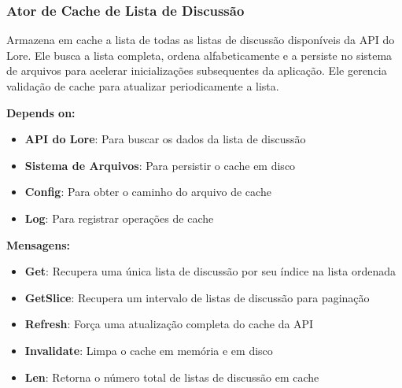 \subsubsection{Ator de Cache de Lista de Discussão}

Armazena em cache a lista de todas as listas de discussão disponíveis da API do Lore. Ele busca a lista completa, ordena alfabeticamente e a persiste no sistema de arquivos para acelerar inicializações subsequentes da aplicação. Ele gerencia validação de cache para atualizar periodicamente a lista.

\textbf{Depends on:}

\begin{itemize}
    \item \textbf{API do Lore}: Para buscar os dados da lista de discussão
    \item \textbf{Sistema de Arquivos}: Para persistir o cache em disco
    \item \textbf{Config}: Para obter o caminho do arquivo de cache
    \item \textbf{Log}: Para registrar operações de cache
\end{itemize}

\textbf{Mensagens:}

\begin{itemize}
    \item \textbf{Get}: Recupera uma única lista de discussão por seu índice na lista ordenada
    \item \textbf{GetSlice}: Recupera um intervalo de listas de discussão para paginação
    \item \textbf{Refresh}: Força uma atualização completa do cache da API
    \item \textbf{Invalidate}: Limpa o cache em memória e em disco
    \item \textbf{Len}: Retorna o número total de listas de discussão em cache
\end{itemize}
